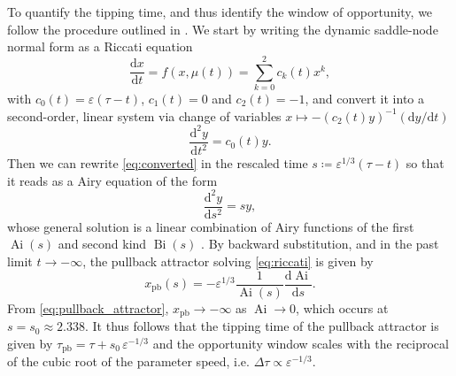 \documentclass[openacc]{rsproca_new}
\newcommand{\dd}{\mathrm{d}}
\newcommand{\Ai}{\operatorname{Ai}}
\newcommand{\Bi}{\operatorname{Bi}}
\begin{document}
To quantify the tipping time, and thus identify the window of opportunity, we follow the procedure outlined in \cite{Li2019}.
We start by writing the dynamic saddle-node normal form as a Riccati equation
%
\begin{equation}\label{eq:riccati}
        \frac{\dd x}{\dd t} = f(x,\mu(t)) = \sum_{k=0}^{2}c_k(t)x^k,
\end{equation}
%
with $c_0(t)=\varepsilon(\tau - t)$, $c_1(t)=0$ and $c_2(t)=-1$, and convert it into a second-order, linear system via change of variables $x\mapsto -(c_2(t)y)^{-1}(\dd y/\dd t)$
%
\begin{equation}\label{eq:converted}
        \frac{\dd^2y}{\dd t^2} = c_0(t)y.
\end{equation}
%
Then we can rewrite \eqref{eq:converted} in the rescaled time $s\coloneqq \varepsilon^{1/3}(\tau -t)$ so that it reads as a Airy equation of the form
%
\begin{equation}\label{eq:airy}
        \frac{\dd^2y}{\dd s^2} = sy,
\end{equation}
%
whose general solution is a linear combination of Airy functions of the first $\Ai(s)$ and second kind $\Bi(s)$ \cite[\S~$10.4$]{Abramowitz1965}.
By backward substitution, and in the past limit $t\to-\infty$, the pullback attractor solving \eqref{eq:riccati} is given by
%
\begin{equation}\label{eq:pullback_attractor}
        x_{\mathrm{pb}}(s) = -\varepsilon^{1/3}\frac{1}{\Ai(s)}\frac{\dd\Ai}{\dd s} .
\end{equation}
%
From \eqref{eq:pullback_attractor}, $x_{\mathrm{pb}}\to-\infty$ as $\Ai\to0$, which occurs at $s = s_0\approx 2.338$.
It thus follows that the tipping time of the pullback attractor is given by $\tau_{\mathrm{pb }} = \tau + s_0\,\varepsilon^{-1/3}$ and the opportunity window scales with the reciprocal of the cubic root of the parameter speed, i.e. $\Delta\tau\propto\varepsilon^{-1/3}$.
\end{document}
